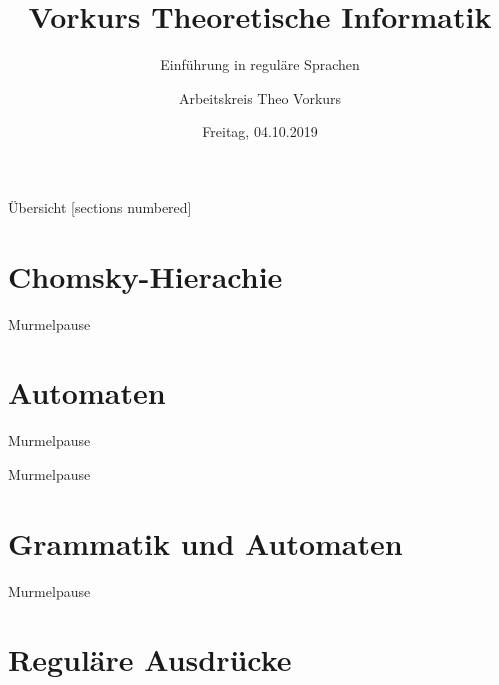

\title{Vorkurs Theoretische Informatik}
\subtitle{Einführung in reguläre Sprachen}
\date{Freitag, 04.10.2019}
\author{Arbeitskreis  Theo Vorkurs}



\maketitle

\begin{frame}[fragile]{Übersicht}
  [sections numbered]
  \tableofcontents%
\end{frame}


\section{Chomsky-Hierachie}



\begin{frame}[standout]
  Murmelpause
\end{frame}

\section{Automaten}



\begin{frame}[standout]
  Murmelpause
\end{frame}



\begin{frame}[standout]
  Murmelpause
\end{frame}

\section{Grammatik und Automaten}



\begin{frame}[standout]
  Murmelpause
\end{frame}

\section{Reguläre Ausdrücke}

